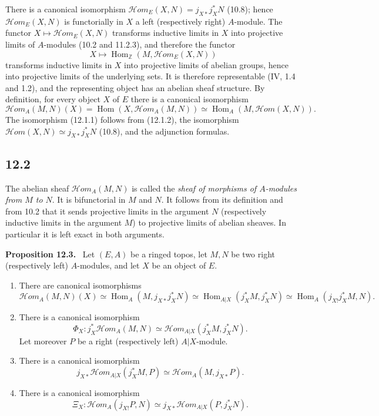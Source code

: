 \documentclass[11pt]{article}
\newcommand{\ZZ}{\mathbb{Z}}
\newcommand{\Hom}{\operatorname{Hom}}
\newcommand{\scrHom}{\mathscr{H}\!om}
\newenvironment{statement}[1]{\par\medskip\noindent\textbf{#1.}\ }{\par\medskip}
\begin{document}
There is a canonical isomorphism $\scrHom_E(X,N)=j_{X*}j_X^*N$ (10.8); hence $\scrHom_E(X,N)$ is functorially in $X$ a left (respectively right) $A$-module. The functor $X\mapsto\scrHom_E(X,N)$ transforms inductive limits in $X$ into projective limits of $A$-modules (10.2 and 11.2.3), and therefore the functor
\[
X\longmapsto \Hom_{\ZZ}(M,\scrHom_E(X,N))
\]
transforms inductive limits in $X$ into projective limits of abelian groups, hence into projective limits of the underlying sets. It is therefore representable (IV, 1.4 and 1.2), and the representing object has an abelian sheaf structure. By definition, for every object $X$ of $E$ there is a canonical isomorphism
\begin{equation}
\scrHom_A(M,N)(X)=\Hom(X,\scrHom_A(M,N))\simeq
\Hom_A(M,\scrHom(X,N)).\tag{12.1.2}
\end{equation}
The isomorphism (12.1.1) follows from (12.1.2), the isomorphism $\scrHom(X,N)\simeq j_{X*}j_X^*N$ (10.8), and the adjunction formulas.

\subsection*{12.2}
The abelian sheaf $\scrHom_A(M,N)$ is called the \emph{sheaf of morphisms of $A$-modules from $M$ to $N$}. It is bifunctorial in $M$ and $N$. It follows from its definition and from 10.2 that it sends projective limits in the argument $N$ (respectively inductive limits in the argument $M$) to projective limits of abelian sheaves. In particular it is left exact in both arguments.

\begin{statement}{Proposition 12.3}
Let $(E,A)$ be a ringed topos, let $M,N$ be two right (respectively left) $A$-modules, and let $X$ be an object of $E$.
\begin{enumerate}[label=\alph*)]
\item There are canonical isomorphisms
\[
\scrHom_A(M,N)(X)\simeq \Hom_A(M,j_{X*}j_X^*N)
\simeq \Hom_{A|X}(j_X^*M,j_X^*N)
\simeq \Hom_A(j_{X!}j_X^*M,N).
\]
\item There is a canonical isomorphism
\[
\Phi_X:j_X^*\scrHom_A(M,N)\simeq \scrHom_{A|X}(j_X^*M,j_X^*N).
\]
Let moreover $P$ be a right (respectively left) $A|X$-module.
\item There is a canonical isomorphism
\[
j_{X*}\scrHom_{A|X}(j_X^*M,P)\simeq \scrHom_A(M,j_{X*}P).
\]
\item There is a canonical isomorphism
\[
\Xi_X:\scrHom_A(j_{X!}P,N)\simeq j_{X*}\scrHom_{A|X}(P,j_X^*N).
\]
\end{enumerate}
\end{statement}
\end{document}
